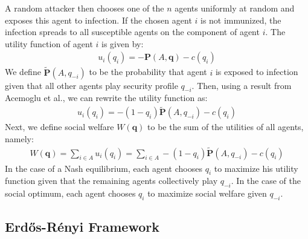 \documentclass{article}
\theoremstyle{plain}
\begin{document}
A random attacker then chooses one of the $n$ agents uniformly at random and exposes this agent to infection. If the chosen agent $i$ is not immunized, the infection spreads to all susceptible agents on the component of agent $i$. The utility function of agent $i$ is given by:
\begin{eqnarray}
	u_i(q_i) = -\textbf{P}(A, \textbf{q}) - c(q_i)
\end{eqnarray} 
We define $\tilde{\textbf{P}}(A,q_{-i})$ to be the probability that agent $i$ is exposed to infection given that all other agents play security profile $q_{-i}$. Then, using a result from Acemoglu et al., we can rewrite the utility function as:
\begin{eqnarray}
	u_i(q_i) = -(1-q_{i})\tilde{\textbf{P}}(A,q_{-i}) - c(q_i)
\end{eqnarray}
Next, we define social welfare $W(\textbf{q})$ to be the sum of the utilities of all agents, namely:
\begin{eqnarray}
	W(\textbf{q}) = \sum\limits_{i \in A} u_i(q_i) = \sum\limits_{i \in A}  -(1-q_{i})\tilde{\textbf{P}}(A,q_{-i}) - c(q_i)
\end{eqnarray}
In the case of a Nash equilibrium, each agent chooses $q_i$ to maximize his utility function given that the remaining agents collectively play $q_{-i}$. In the case of the social optimum, each agent chooses $q_i$ to maximize social welfare given $q_{-i}$.

\subsection{Erd\H{o}s-R\'{e}nyi Framework}
\end{document}
